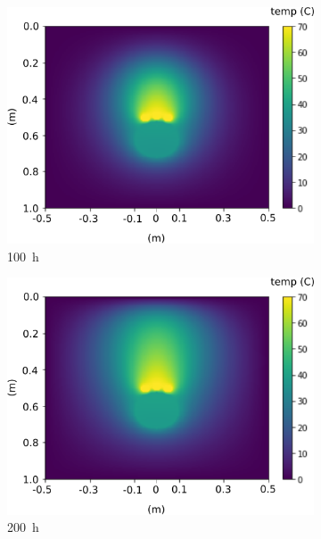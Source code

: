 \documentclass[Journal,letterpaper,InsideFigs]{ascelike-new}
\begin{document}
\begin{figure}[ht]\ContinuedFloat 
 \begin{subfigure}[b]{0.49\textwidth}
    \includegraphics[width=\textwidth]{figs/time-evol/100h.png}
    \caption{\SI{100}{\hour}}
 \end{subfigure}             
 \begin{subfigure}[b]{0.49\textwidth}
    \includegraphics[width=\textwidth]{figs/time-evol/200h.png}
    \caption{\SI{200}{\hour}}
    \label{fig:200}
 \end{subfigure}  \\
  \begin{subfigure}[b]{0.49\textwidth}

\end{subfigure}
\end{figure}
\end{document}
